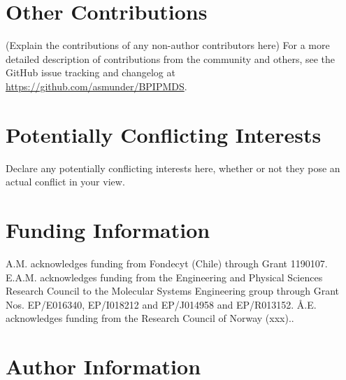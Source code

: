 \documentclass[9pt,bestpractices]{livecoms}
\newcommand{\githubrepository}{\url{https://github.com/asmunder/BPIPMDS}}  %
\begin{document}
\section{Other Contributions}
%

(Explain the contributions of any non-author contributors here)
For a more detailed description of contributions from the community and others, see the GitHub issue tracking and changelog at \githubrepository.

\section{Potentially Conflicting Interests}

Declare any potentially conflicting interests here, whether or not they pose an actual conflict in your view.

\section{Funding Information}
A.M. acknowledges funding from Fondecyt (Chile) through Grant 1190107. E.A.M.
acknowledges funding from the Engineering and Physical Sciences Research
Council to the Molecular Systems Engineering group through Grant Nos.
\colorbox{color-1}{EP/E016340, EP/I018212} and EP/J014958 and EP/R013152.
\AA{}.E. acknowledges funding from \colorbox{color-1}{the Research Council of
Norway (xxx)..} 

\section*{Author Information}
\makeorcid




\end{document}
